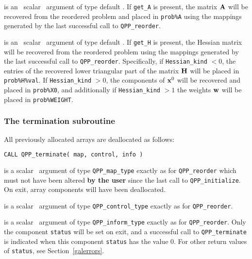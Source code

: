 \documentclass{galahad}
\newcommand{\packagename}{QPP}
\begin{document}
\begin{description}
is an \optional\ scalar \intentin\ argument of type default \logical. 
If {\tt get\_A} is present, the matrix ${\mathbf{A}}$
will be recovered from the reordered problem and placed in {\tt prob\%A} 
using the mappings generated by the last successful call to 
{\tt \packagename\_reorder}. 
 
is an \optional\ scalar \intentin\ argument of type default \logical. 
If {\tt get\_H} is present, the Hessian matrix will be recovered  from the
reordered problem using the mappings generated by the last successful call to 
{\tt \packagename\_reorder}. 
Specifically, if {\tt Hessian\_kind} $< 0$, the entries of the 
recovered lower triangular part of the matrix ${\mathbf{H}}$ will be placed in
{\tt prob\%H\%val}. If {\tt Hessian\_kind} $> 0$, the 
components of ${\mathbf{x}}^0$ will be recovered and placed in 
{\tt prob\%X0}, and additionally if {\tt Hessian\_kind} $> 1$ 
the weights ${\mathbf{w}}$ will be placed in {\tt prob\%WEIGHT}.
 
\end{description}


\subsubsection{The  termination subroutine}
All previously allocated arrays are deallocated as follows:
\vspace*{1mm}

\hspace{8mm}
{\tt CALL \packagename\_terminate( map, control, info )}

\vspace*{-3mm}
\begin{description}

 is a scalar \intentinout\ argument of type 
{\tt \packagename\_map\_type} 
exactly as for 
{\tt \packagename\_reorder}
which must not have been altered {\bf by the user} since the last call to 
{\tt \packagename\_initialize}.
On exit, array components will have been deallocated.

 is a scalar \intentin\ argument of type 
{\tt \packagename\_control\_type}
exactly as for
{\tt \packagename\_reorder}.

 is a scalar \intentout\ argument of type 
{\tt \packagename\_inform\_type}
exactly as for
{\tt \packagename\_reorder}.
Only the component {\tt status} will be set on exit, and a 
successful call to 
{\tt \packagename\_terminate}
is indicated when this  component {\tt status} has the value 0. 
For other return values of {\tt status}, see Section~\ref{galerrors}.

\end{description}
\end{document}
